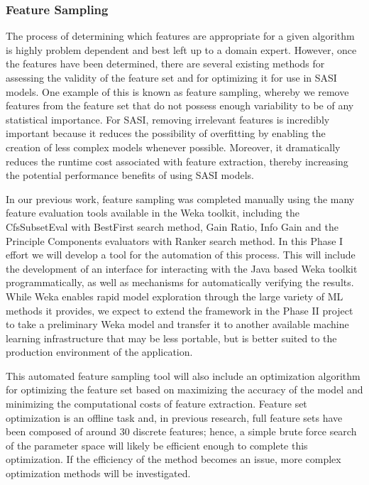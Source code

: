 \subsubsection{Feature Sampling}  The process of determining which features are appropriate for a given algorithm is highly problem dependent and best left up to a domain expert. However, once the features have been determined, there are several existing methods for assessing the validity of the feature set and for optimizing it for use in SASI models. One example of this is known as feature sampling, whereby we remove features from the feature set that do not possess enough variability to be of any statistical importance. For SASI, removing irrelevant features is incredibly important because it reduces the possibility of overfitting by enabling the creation of less complex models whenever possible. Moreover, it dramatically reduces the runtime cost associated with feature extraction, thereby increasing the potential performance benefits of using SASI models. 

In our previous work, feature sampling was completed manually using the many feature evaluation tools available in the Weka toolkit, including the CfsSubsetEval with BestFirst search method, Gain Ratio, Info Gain and the Principle Components evaluators with Ranker search method. In this Phase I effort we will develop a tool for the automation of this process. This will include the development of an interface for interacting with the Java based Weka toolkit programmatically, as well as mechanisms for automatically verifying the results. While Weka enables rapid model exploration through the large variety of ML methods it provides, we expect to extend the framework in the Phase II project to take a preliminary Weka model and transfer it to another available machine learning infrastructure that may be less portable, but is better suited to the production environment of the application.

This automated feature sampling tool will also include an optimization algorithm for optimizing the feature set based on maximizing the accuracy of the model and minimizing the computational costs of feature extraction. Feature set optimization is an offline task and, in previous research, full feature sets have been composed of around 30 discrete features; hence, a simple brute force search of the parameter space will likely be efficient enough to complete this optimization. If the efficiency of the method becomes an issue, more complex optimization methods will be investigated. 
  
